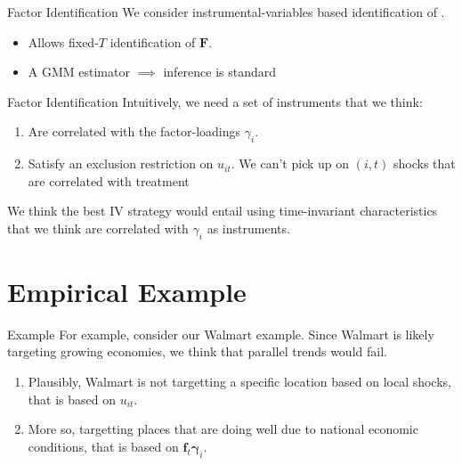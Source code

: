 \documentclass[aspectratio=43,t]{beamer}
\begin{document}
\begin{frame}{Factor Identification}
  We consider instrumental-variables based identification of \citet{Ahn_Lee_Schmidt_2013}.
  \begin{itemize}
    \item Allows fixed-$T$ identification of $\bm{F}$.
    \item A GMM estimator $\implies$ inference is standard
  \end{itemize}

\end{frame}

\begin{frame}{Factor Identification}
  Intuitively, we need a set of instruments that we think:

  \begin{enumerate}
    \item Are correlated with the factor-loadings $\gamma_i$.

    \item Satisfy an exclusion restriction on $u_{it}$. We can't pick up on $(i,t)$ shocks that are correlated with treatment
  \end{enumerate}

  \bigskip
  We think the best IV strategy would entail using time-invariant characteristics that we think are correlated with $\gamma_i$ as instruments.
\end{frame}

\section{Empirical Example}

\begin{frame}{Example}
  For example, consider our Walmart example. Since Walmart is likely targeting growing economies, we think that parallel trends would fail.

  \begin{enumerate}
    \item Plausibly, Walmart is not targetting a specific location based on local shocks, that is based on $u_{it}$.

    \item More so, targetting places that are doing well due to national economic conditions, that is based on $\bm{f}_t \bm{\gamma}_i$.
  \end{enumerate}
\end{frame}
\end{document}
